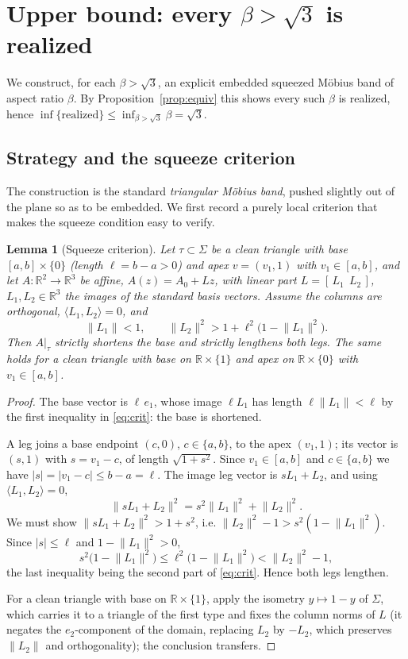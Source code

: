 \documentclass[11pt]{article}
\newtheorem{lemma}{Lemma}
\theoremstyle{definition}
\newcommand{\R}{\mathbb{R}}
\newcommand{\Sg}{\Sigma}
\newcommand{\norm}[1]{\lVert #1 \rVert}
\newcommand{\abs}[1]{\lvert #1 \rvert}
\begin{document}
\section{Upper bound: every $\beta>\sqrt3$ is realized}\label{sec:upper}

We construct, for each $\beta>\sqrt3$, an explicit embedded squeezed M\"obius band of
aspect ratio $\beta$. By Proposition~\ref{prop:equiv} this shows every such $\beta$ is
realized, hence $\inf\{\text{realized}\}\le\inf_{\beta>\sqrt3}\beta=\sqrt3$.

\subsection{Strategy and the squeeze criterion}

The construction is the standard \emph{triangular M\"obius band}, pushed slightly out of
the plane so as to be embedded. We first record a purely local criterion that makes the
squeeze condition easy to verify.

\begin{lemma}[Squeeze criterion]\label{lem:squeeze}
Let $\tau\subset\Sg$ be a clean triangle with base $[a,b]\times\{0\}$ (length
$\ell=b-a>0$) and apex $v=(v_1,1)$ with $v_1\in[a,b]$, and let $A:\R^2\to\R^3$ be affine,
$A(z)=A_0+Lz$, with linear part $L=[\,L_1\ \ L_2\,]$, $L_1,L_2\in\R^3$ the images of the
standard basis vectors. Assume the columns are orthogonal, $\langle L_1,L_2\rangle=0$, and
\begin{equation}\label{eq:crit}
\norm{L_1}<1,\qquad
\norm{L_2}^2>1+\ell^2\bigl(1-\norm{L_1}^2\bigr).
\end{equation}
Then $A|_\tau$ strictly shortens the base and strictly lengthens both legs. The same holds
for a clean triangle with base on $\R\times\{1\}$ and apex on $\R\times\{0\}$ with
$v_1\in[a,b]$.
\end{lemma}

\begin{proof}
The base vector is $\ell\,e_1$, whose image $\ell L_1$ has length $\ell\norm{L_1}<\ell$ by
the first inequality in \eqref{eq:crit}: the base is shortened.

A leg joins a base endpoint $(c,0)$, $c\in\{a,b\}$, to the apex $(v_1,1)$; its vector is
$(s,1)$ with $s=v_1-c$, of length $\sqrt{1+s^2}$. Since $v_1\in[a,b]$ and $c\in\{a,b\}$ we
have $\abs s=\abs{v_1-c}\le b-a=\ell$. The image leg vector is $sL_1+L_2$, and using
$\langle L_1,L_2\rangle=0$,
\[
\norm{sL_1+L_2}^2=s^2\norm{L_1}^2+\norm{L_2}^2 .
\]
We must show $\norm{sL_1+L_2}^2>1+s^2$, i.e.
$\norm{L_2}^2-1>s^2(1-\norm{L_1}^2)$. Since $\abs s\le\ell$ and $1-\norm{L_1}^2>0$,
\[
s^2\bigl(1-\norm{L_1}^2\bigr)\le\ell^2\bigl(1-\norm{L_1}^2\bigr)<\norm{L_2}^2-1,
\]
the last inequality being the second part of \eqref{eq:crit}. Hence both legs lengthen.

For a clean triangle with base on $\R\times\{1\}$, apply the isometry $y\mapsto 1-y$ of
$\Sg$, which carries it to a triangle of the first type and fixes the column norms of $L$
(it negates the $e_2$-component of the domain, replacing $L_2$ by $-L_2$, which preserves
$\norm{L_2}$ and orthogonality); the conclusion transfers.
\end{proof}
\end{document}
